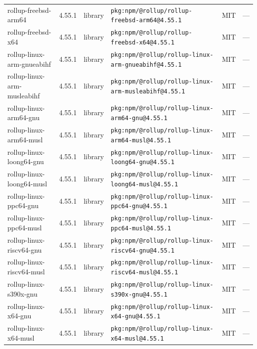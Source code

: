 \documentclass[11pt,a4paper]{article}
\begin{document}
\begin{longtable}{|p{4cm}|p{2cm}|p{1.6cm}|p{5cm}|p{1.5cm}|p{3.5cm}|}
\raggedright rollup-freebsd-arm64 & 4.55.1 & library & \small\texttt{pkg:npm/@rollup/rollup-freebsd-arm64@4.55.1} & MIT & \small — \\
\raggedright rollup-freebsd-x64 & 4.55.1 & library & \small\texttt{pkg:npm/@rollup/rollup-freebsd-x64@4.55.1} & MIT & \small — \\
\raggedright rollup-linux-arm-gnueabihf & 4.55.1 & library & \small\texttt{pkg:npm/@rollup/rollup-linux-arm-gnueabihf@4.55.1} & MIT & \small — \\
\raggedright rollup-linux-arm-musleabihf & 4.55.1 & library & \small\texttt{pkg:npm/@rollup/rollup-linux-arm-musleabihf@4.55.1} & MIT & \small — \\
\raggedright rollup-linux-arm64-gnu & 4.55.1 & library & \small\texttt{pkg:npm/@rollup/rollup-linux-arm64-gnu@4.55.1} & MIT & \small — \\
\raggedright rollup-linux-arm64-musl & 4.55.1 & library & \small\texttt{pkg:npm/@rollup/rollup-linux-arm64-musl@4.55.1} & MIT & \small — \\
\raggedright rollup-linux-loong64-gnu & 4.55.1 & library & \small\texttt{pkg:npm/@rollup/rollup-linux-loong64-gnu@4.55.1} & MIT & \small — \\
\raggedright rollup-linux-loong64-musl & 4.55.1 & library & \small\texttt{pkg:npm/@rollup/rollup-linux-loong64-musl@4.55.1} & MIT & \small — \\
\raggedright rollup-linux-ppc64-gnu & 4.55.1 & library & \small\texttt{pkg:npm/@rollup/rollup-linux-ppc64-gnu@4.55.1} & MIT & \small — \\
\raggedright rollup-linux-ppc64-musl & 4.55.1 & library & \small\texttt{pkg:npm/@rollup/rollup-linux-ppc64-musl@4.55.1} & MIT & \small — \\
\raggedright rollup-linux-riscv64-gnu & 4.55.1 & library & \small\texttt{pkg:npm/@rollup/rollup-linux-riscv64-gnu@4.55.1} & MIT & \small — \\
\raggedright rollup-linux-riscv64-musl & 4.55.1 & library & \small\texttt{pkg:npm/@rollup/rollup-linux-riscv64-musl@4.55.1} & MIT & \small — \\
\raggedright rollup-linux-s390x-gnu & 4.55.1 & library & \small\texttt{pkg:npm/@rollup/rollup-linux-s390x-gnu@4.55.1} & MIT & \small — \\
\raggedright rollup-linux-x64-gnu & 4.55.1 & library & \small\texttt{pkg:npm/@rollup/rollup-linux-x64-gnu@4.55.1} & MIT & \small — \\
\raggedright rollup-linux-x64-musl & 4.55.1 & library & \small\texttt{pkg:npm/@rollup/rollup-linux-x64-musl@4.55.1} & MIT & \small — \\

\end{longtable}
\end{document}
